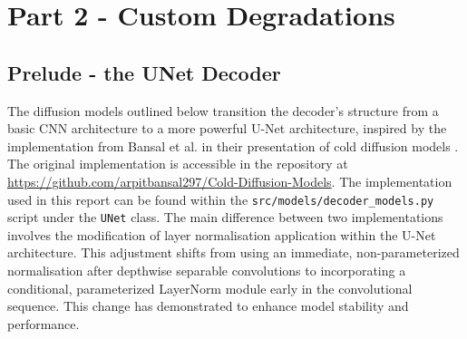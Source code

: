 \documentclass[11pt]{article}
\begin{document}
\section{Part 2 - Custom Degradations}
\subsection{Prelude - the UNet Decoder}
The diffusion models outlined below transition the decoder's structure from a basic CNN architecture to a more powerful U-Net architecture, inspired by the implementation from Bansal et al. in their presentation of cold diffusion models \cite{bansal2022cold}. The original implementation is accessible in the repository at \url{https://github.com/arpitbansal297/Cold-Diffusion-Models}. The implementation used in this report can be found within the \texttt{src/models/decoder\_models.py} script under the \texttt{UNet} class.
The main difference between two implementations involves the modification of layer normalisation application within the U-Net architecture. This adjustment shifts from using an immediate, non-parameterized normalisation after depthwise separable convolutions to incorporating a conditional, parameterized LayerNorm module early in the convolutional sequence. This change has demonstrated to enhance model stability and performance.
\end{document}
